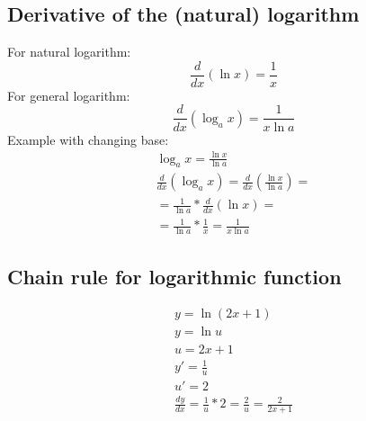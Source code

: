 \documentclass{article}
\begin{document}
\subsection{Derivative of the (natural) logarithm}
For natural logarithm:
\begin{equation}
  \frac{d}{dx}(\ln x) = \frac{1}{x}
\end{equation}
For general logarithm:
\begin{equation}
  \frac{d}{dx}(\log_a x) = \frac{1}{x\ln a}
\end{equation}
Example with changing base:
\begin{equation}
  \begin{gathered}
    \log_ax = \frac{\ln x}{\ln a} \\
    \frac{d}{dx}(\log_ax) = \frac{d}{dx}(\frac{\ln x}{\ln a}) = \\
    = \frac{1}{\ln a} * \frac{d}{dx}(\ln x) = \\
    = \frac{1}{\ln a} * \frac{1}{x} = \frac{1}{x\ln a}
  \end{gathered}
\end{equation}
\subsection{Chain rule for logarithmic function}
\begin{equation}
  \begin{gathered}
    y = \ln(2x+1) \\
    y = \ln u \\
    u = 2x+1 \\
    y' = \frac{1}{u} \\
    u' = 2 \\
    \frac{dy}{dx} = \frac{1}{u} * 2 = \frac{2}{u} = \frac{2}{2x+1}
  \end{gathered}
\end{equation}
\end{document}
